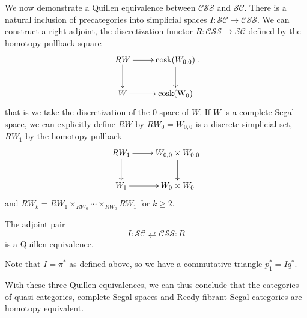 \begin{refsection}
We now demonstrate a Quillen equivalence between $\mathcal{CSS}$ and $\mathcal{SC}$. There is a natural inclusion of precategories into simplicial spaces $I:\mathcal{SC}\to\mathcal{CSS}$. We can construct a right adjoint, the discretization functor $R:\mathcal{CSS}\to\mathcal{SC}$ defined by the homotopy pullback square
$$\xymatrix{RW\ar[r]\ar[d]&\mathrm{cosk}(W_{0,0})\ar[d]\\W\ar[r]&\mathrm{cosk(W_0)}},$$
that is we take the discretization of the 0-space of $W$. If $W$ is a complete Segal space, we can explicitly define $RW$ by $RW_0=W_{0,0}$ is a discrete simplicial set, $RW_1$ by the homotopy pullback
$$\xymatrix{RW_1\ar[r]\ar[d]&W_{0,0}\times W_{0,0}\ar[d]\\W_1\ar[r]&W_0\times W_0}$$
and $RW_k=RW_1\times_{RW_0}\cdots\times_{RW_0}RW_1$ for $k\ge2$.
\begin{thm}\cite{bergner-characterization-of-fibrant-segal-categories}
The adjoint pair
$$I:\mathcal{SC}\rightleftarrows\mathcal{CSS}:R$$
is a Quillen equivalence.
\end{thm}

Note that $I=\pi^*$ as defined above, so we have a commutative triangle $p_1^*=Iq^*$.

With these three Quillen equivalences, we can thus conclude that the categories of quasi-categories, complete Segal spaces and Reedy-fibrant Segal categories are homotopy equivalent.

\printbibliography[heading = local]

\end{refsection}
